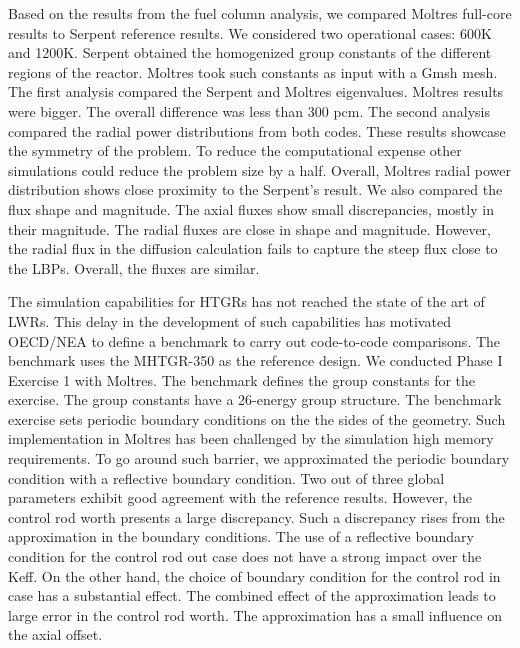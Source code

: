 \documentclass[11pt,letterpaper]{article}
\begin{document}
Based on the results from the fuel column analysis, we compared Moltres full-core results to Serpent reference results.
We considered two operational cases: 600K and 1200K.
Serpent obtained the homogenized group constants of the different regions of the reactor.
Moltres took such constants as input with a Gmsh mesh.
The first analysis compared the Serpent and Moltres eigenvalues.
Moltres results were bigger.
The overall difference was less than 300 pcm.
The second analysis compared the radial power distributions from both codes.
These results showcase the symmetry of the problem.
To reduce the computational expense other simulations could reduce the problem size by a half.
Overall, Moltres radial power distribution shows close proximity to the Serpent's result.
We also compared the flux shape and magnitude.
The axial fluxes show small discrepancies, mostly in their magnitude.
The radial fluxes are close in shape and magnitude.
However, the radial flux in the diffusion calculation fails to capture the steep flux close to the LBPs.
Overall, the fluxes are similar.

The simulation capabilities for HTGRs has not reached the state of the art of LWRs.
This delay in the development of such capabilities has motivated OECD/NEA to define a benchmark to carry out code-to-code comparisons.
The benchmark uses the MHTGR-350 as the reference design.
We conducted Phase I Exercise 1 with Moltres.
The benchmark defines the group constants for the exercise.
The group constants have a 26-energy group structure.
The benchmark exercise sets periodic boundary conditions on the the sides of the geometry.
Such implementation in Moltres has been challenged by the simulation high memory requirements.
To go around such barrier, we approximated the periodic boundary condition with a reflective boundary condition.
Two out of three global parameters exhibit good agreement with the reference results.
However, the control rod worth presents a large discrepancy.
Such a discrepancy rises from the approximation in the boundary conditions.
The use of a reflective boundary condition for the control rod out case does not have a strong impact over the \gls{Keff}.
On the other hand, the choice of boundary condition for the control rod in case has a substantial effect.
The combined effect of the approximation leads to large error in the control rod worth.
The approximation has a small influence on the axial offset.



\pagebreak


\end{document}
